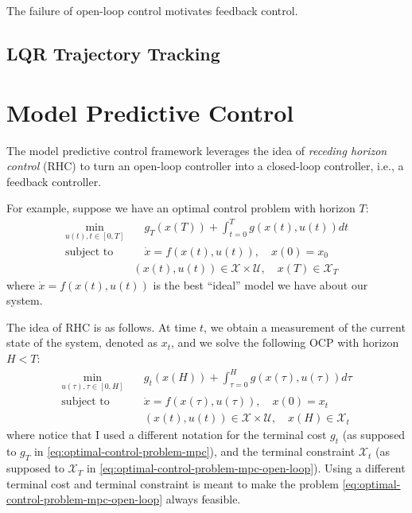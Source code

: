 \documentclass[
]{book}
\theoremstyle{definition}
\theoremstyle{definition}
\theoremstyle{definition}
\theoremstyle{definition}
\theoremstyle{remark}
\begin{document}
The failure of open-loop control motivates feedback control.

\hypertarget{lqr-trajectory-tracking}{%
\subsection{LQR Trajectory Tracking}\label{lqr-trajectory-tracking}}

\hypertarget{model-predictive-control}{%
\section{Model Predictive Control}\label{model-predictive-control}}

The model predictive control framework leverages the idea of \emph{receding horizon control} (RHC) to turn an open-loop controller into a closed-loop controller, i.e., a feedback controller.

For example, suppose we have an optimal control problem with horizon \(T\):
\begin{equation}
\begin{split}
\min_{u(t), t \in [0,T]} & \quad g_T(x(T)) + \int_{t=0}^T g(x(t),u(t)) dt \\
\text{subject to} & \quad \dot{x} = f(x(t),u(t)), \quad x(0) = x_0 \\
& (x(t),u(t)) \in \mathcal{X} \times \mathcal{U}, \quad x(T) \in \mathcal{X}_T 
\end{split}
\label{eq:optimal-control-problem-mpc}
\end{equation}
where \(\dot{x} = f(x(t),u(t))\) is the best ``ideal'' model we have about our system.

The idea of RHC is as follows. At time \(t\), we obtain a measurement of the current state of the system, denoted as \(x_t\), and we solve the following OCP with horizon \(H < T\):
\begin{equation}
\begin{split}
\min_{u(\tau), \tau \in [0,H]} & \quad g_t(x(H)) + \int_{\tau = 0}^H g(x(\tau),u(\tau)) d\tau \\
\text{subject to} & \quad  \dot{x} = f(x(\tau),u(\tau)), \quad x(0) = x_t \\
& \quad (x(t),u(t)) \in \mathcal{X} \times \mathcal{U}, \quad x(H) \in \mathcal{X}_{t}
\end{split}
\label{eq:optimal-control-problem-mpc-open-loop}
\end{equation}
where notice that I used a different notation for the terminal cost \(g_t\) (as supposed to \(g_T\) in \eqref{eq:optimal-control-problem-mpc}), and the terminal constraint \(\mathcal{X}_t\) (as supposed to \(\mathcal{X}_T\) in \eqref{eq:optimal-control-problem-mpc-open-loop}). Using a different terminal cost and terminal constraint is meant to make the problem \eqref{eq:optimal-control-problem-mpc-open-loop} always feasible.
\end{document}
